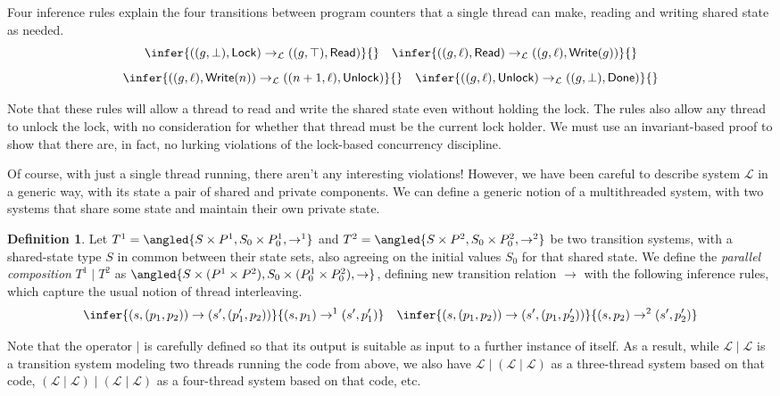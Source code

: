 \documentclass{amsbook}
\theoremstyle{definition}
\newtheorem{definition}[theorem]{Definition}
\theoremstyle{remark}
\numberwithin{section}{chapter}
\numberwithin{equation}{chapter}
\begin{document}
Four inference rules explain the four transitions between program counters that a single thread can make, reading and writing shared state as needed.
$$\infer{((g, \bot), \mathsf{Lock}) \to_{\mathcal L} ((g, \top), \mathsf{Read})}{}
\quad \infer{((g, \ell), \mathsf{Read}) \to_{\mathcal L} ((g, \ell), \mathsf{Write}(g))}{}$$
$$\infer{((g, \ell), \mathsf{Write}(n)) \to_{\mathcal L} ((n+1, \ell), \mathsf{Unlock})}{}
\quad \infer{((g, \ell), \mathsf{Unlock}) \to_{\mathcal L} ((g, \bot), \mathsf{Done})}{}$$

\smallskip

Note that these rules will allow a thread to read and write the shared state even without holding the lock.
The rules also allow any thread to unlock the lock, with no consideration for whether that thread must be the current lock holder.
We must use an invariant-based proof to show that there are, in fact, no lurking violations of the lock-based concurrency discipline.

Of course, with just a single thread running, there aren't any interesting violations!
However, we have been careful to describe system $\mathcal L$ in a generic way, with its state a pair of shared and private components.
We can define a generic notion of a multithreaded system, with two systems that share some state and maintain their own private state.

\encoding
\begin{definition}
  Let $T^1 = \angled{S \times P^1, S_0 \times P^1_0, \to^1}$ and $T^2 = \angled{S \times P^2, S_0 \times P^2_0, \to^2}$ be two transition systems, with a shared-state type $S$ in common between their state sets, also agreeing on the initial values $S_0$ for that shared state.  We define the \emph{parallel composition} $T^1 \mid T^2$ as $\angled{S \times (P^1 \times P^2), S_0 \times (P^1_0 \times P^2_0), \to}$, defining new transition relation $\to$ with the following inference rules, which capture the usual notion of thread interleaving.
  $$\infer{(s, (p_1, p_2)) \to (s', (p'_1, p_2))}{
    (s, p_1) \to^1 (s', p'_1)
  }
  \quad \infer{(s, (p_1, p_2)) \to (s', (p_1, p'_2))}{
    (s, p_2) \to^2 (s', p'_2)
  }$$
\end{definition}

Note that the operator $\mid$ is carefully defined so that its output is suitable as input to a further instance of itself.
As a result, while $\mathcal L \mid \mathcal L$ is a transition system modeling two threads running the code from above, we also have $\mathcal L \mid (\mathcal L \mid \mathcal L)$ as a three-thread system based on that code, $(\mathcal L \mid \mathcal L) \mid (\mathcal L \mid \mathcal L)$ as a four-thread system based on that code, etc.
\end{document}

